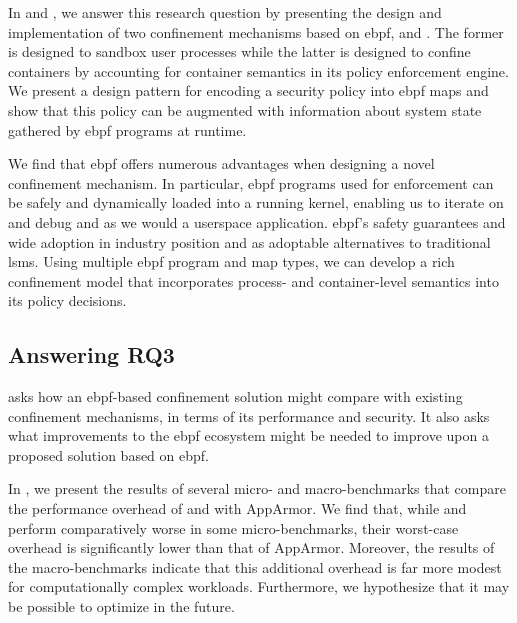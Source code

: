 In  and , we answer this research question by presenting
the design and implementation of two confinement mechanisms based on \gls{ebpf}, \bpfbox{}
and \bpfcontain{}. The former is designed to sandbox user processes while the latter is
designed to confine containers by accounting for container semantics in its policy
enforcement engine. We present a design pattern for encoding a security policy into
\gls{ebpf} maps and show that this policy can be augmented with information about
system state gathered by \gls{ebpf} programs at runtime.

We find that \gls{ebpf} offers numerous advantages when designing a novel confinement
mechanism. In particular, \gls{ebpf} programs used for enforcement can be safely and
dynamically loaded into a running kernel, enabling us to iterate on and debug \bpfbox{}
and \bpfcontain{} as we would a userspace application. \gls{ebpf}'s safety guarantees and
wide adoption in industry position \bpfbox{} and \bpfcontain{} as adoptable alternatives
to traditional \glspl{lsm}. Using multiple \gls{ebpf} program and map types, we can
develop a rich confinement model that incorporates process- and container-level semantics
into its policy decisions.

\subsection{Answering RQ3}%
\label{ss:disc-rq3}

 asks how an \gls{ebpf}-based confinement solution might compare with existing
confinement mechanisms, in terms of its performance and security. It also asks what
improvements to the \gls{ebpf} ecosystem might be needed to improve upon a proposed
solution based on \gls{ebpf}.

In , we present the results of several micro- and macro-benchmarks that
compare the performance overhead of \bpfbox{} and \bpfcontain{} with AppArmor.  We find
that, while \bpfbox{} and \bpfcontain{} perform comparatively worse in some
micro-benchmarks, their worst-case overhead is significantly lower than that of AppArmor.
Moreover, the results of the macro-benchmarks indicate that this additional overhead
is far more modest for computationally complex workloads. Furthermore, we
hypothesize that it may be possible to optimize \bpfcontain{} in the future.

